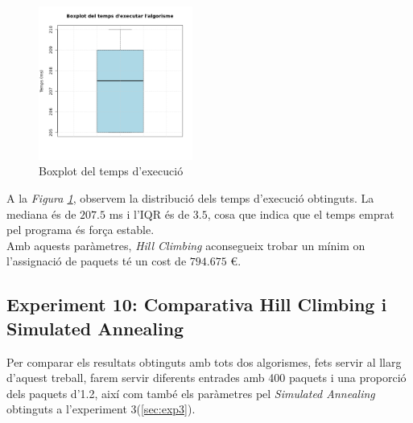 \documentclass[a4paper]{article}
\begin{document}
	\begin{figure}[H]
		\centering
		\includegraphics[width=0.45\textwidth]{images/exp9_boxplot.png}
		\caption{Boxplot del temps d'execució}
		\label{fig:exp9_boxplot}
	\end{figure}
	
	A la \textit{Figura \ref{fig:exp9_boxplot}}, observem la distribució dels temps d'execució obtinguts. La mediana és de $207.5$ ms i l'IQR és de $3.5$, cosa que indica que el temps emprat pel programa és força estable. \\
	
	Amb aquests paràmetres, \textit{Hill Climbing} aconsegueix trobar un mínim on l'assignació de paquets té un cost de $794.675$ €.
	
	\subsection{Experiment 10: Comparativa Hill Climbing i Simulated Annealing}
	
	Per comparar els resultats obtinguts amb tots dos algorismes, fets servir al llarg d'aquest treball, farem servir diferents entrades amb 400 paquets i una proporció dels paquets d'1.2, així com també els paràmetres pel \textit{Simulated Annealing} obtinguts a l'experiment 3(\ref{sec:exp3}).
	
\end{document}

